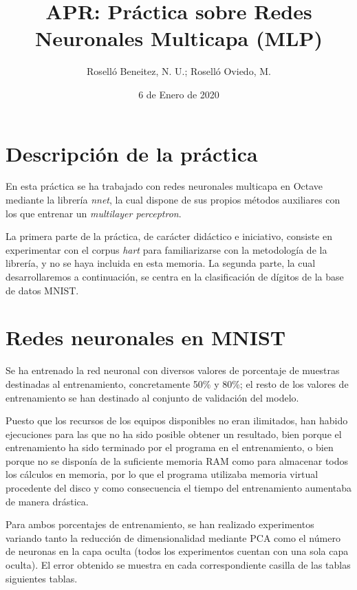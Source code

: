 \documentclass[a4paper]{article}
\begin{document}
\author{Roselló Beneitez, N. U.; Roselló Oviedo, M.}
\title{APR: Práctica sobre Redes Neuronales Multicapa (MLP)}
\date{6 de Enero de 2020}
\maketitle{}
\thispagestyle{empty}

\newpage
\tableofcontents
\listoffigures

\newpage
\section{Descripción de la práctica}
\quad En esta práctica se ha trabajado con redes neuronales multicapa en Octave mediante la librería \textit{nnet}, la cual dispone de sus propios métodos auxiliares con los que entrenar un \textit{multilayer perceptron}.

\quad La primera parte de la práctica, de carácter didáctico e iniciativo, consiste en experimentar con el corpus \textit{hart} para familiarizarse con la metodología de la librería, y no se haya incluida en esta memoria. La segunda parte, la cual desarrollaremos a continuación, se centra en la clasificación de dígitos de la base de datos MNIST.

\section{Redes neuronales en MNIST}
\quad Se ha entrenado la red neuronal con diversos valores de porcentaje de muestras destinadas al entrenamiento, concretamente 50\% y 80\%; el resto de los valores de entrenamiento se han destinado al conjunto de validación del modelo.

\quad Puesto que los recursos de los equipos disponibles no eran ilimitados, han habido ejecuciones para las que no ha sido posible obtener un resultado, bien porque el entrenamiento ha sido terminado por el programa en el entrenamiento, o bien porque no se disponía de la suficiente memoria RAM como para almacenar todos los cálculos en memoria, por lo que el programa utilizaba memoria virtual procedente del disco y como consecuencia el tiempo del entrenamiento aumentaba de manera drástica.

\quad Para ambos porcentajes de entrenamiento, se han realizado experimentos variando tanto la reducción de dimensionalidad mediante PCA como el número de neuronas en la capa oculta (todos los experimentos cuentan con una sola capa oculta). El error obtenido se muestra en cada correspondiente casilla de las tablas siguientes tablas.
\end{document}
